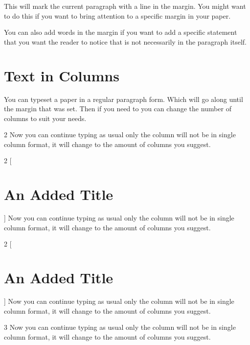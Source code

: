 \documentclass[12pt]{article}   %
\theoremstyle{plain}
\begin{document}
\marginpar{\rule[-17.5mm]{1mm}{18mm}}
This will mark the current paragraph with a line in the margin.  You might want to do this if you want to bring attention to a specific margin in your paper. 

You can also add words in the margin if you want to add a specific statement that you want the reader to notice that is not necessarily in the paragraph itself.

\section{Text in Columns}\label{sec:columns}

You can typeset a paper in a regular paragraph form. Which will go along until the margin that was set.  Then if you need to you can change the number of columns to suit your needs.

\begin{multicols}{2}
Now you can continue typing as usual only the column will not be in single column format, it will change to the amount of columns you suggest.
\end{multicols}

\clearpage

\begin{multicols}{2}
[\section*{An Added Title}]
Now you can continue typing as usual only the column will not be in single column format, it will change to the amount of columns you suggest.
\end{multicols}

\begin{multicols}{2}
[\section*{An Added Title}]
Now you can continue typing as usual only the column will not be in single column format, it will change to the amount of columns you suggest.
\end{multicols}

{\setlength{\columnseprule}{2pt}
\begin{multicols}{3}
Now you can continue typing as usual only the column will not be in single column format, it will change to the amount of columns you suggest.
\end{multicols}
}
\end{document}
